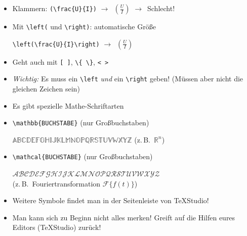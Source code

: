 \begin{frame}[<+->][fragile]
	\begin{itemize}
		\item Klammern: \lstinline!(\frac{U}{I})!
		$\rightarrow$~$\displaystyle(\frac{U}{I})$
		$\rightarrow$~Schlecht!
		\item Mit \lstinline!\left(! und \lstinline!\right)!: automatische Größe
		
		\lstinline!\left(\frac{U}{I}\right)!
		$\rightarrow$~$\displaystyle\left(\frac{U}{I}\right)$
		\item Geht auch mit \lstinline![ ]!, \lstinline!\{ \}!, \lstinline!< >!
		\item \emph{Wichtig:} Es muss ein \lstinline!\left! \emph{und} ein \lstinline!\right! geben! (Müssen aber nicht die gleichen Zeichen sein)
		\item Es gibt spezielle Mathe-Schriftarten
		\item \lstinline!\mathbb{BUCHSTABE}! (nur Großbuchstaben)
		
		$\mathbb{ABCDEFGHIJKLMNOPQRSTUVWXYZ}$ (z.\,B.\ $\mathbb{R}^n$)
		\item \lstinline!\mathcal{BUCHSTABE}! (nur Großbuchstaben)
		
		$\mathcal{ABCDEFGHIJKLMNOPQRSTUVWXYZ}$\\
		(z.\,B.\ Fouriertransformation $\mathcal{F}\{f(t)\}$)
		
		\item Weitere Symbole findet man in der Seitenleiste von TeXStudio!
		\item Man kann sich zu Beginn nicht alles merken! Greift auf die Hilfen eures Editors (TeXStudio) zurück!
	\end{itemize}
\end{frame}

